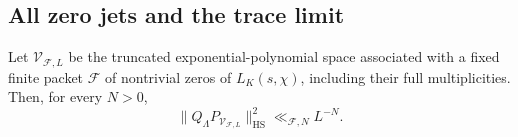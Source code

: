 \subsection{All zero jets and the trace limit}

\begin{proposition}\label{nh:zero-packets}
Let $\mathcal V_{\mathcal F,L}$ be the truncated
exponential-polynomial space associated with a fixed finite
packet $\mathcal F$ of nontrivial zeros of $L_K(s,\chi)$,
including their full multiplicities. Then, for every $N>0$,
\begin{equation}\label{nh:zero-packet-bound}
 \|Q_\Lambda P_{\mathcal V_{\mathcal F,L}}\|_{\mathrm{HS}}^2
                                  \ll_{\mathcal F,N}L^{-N}.
\end{equation}
\end{proposition}

